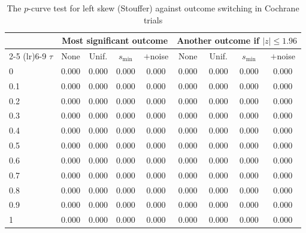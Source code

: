 \begin{table}[htbp]
\centering
\caption{The $p$-curve test for left skew (Stouffer) against outcome switching in Cochrane trials}
\label{tab:cochrane_switching_power_desktop_stouffer}
\footnotesize
\setlength{\tabcolsep}{4pt}
\begin{tabular}{lcccccccc}
\toprule
 & \multicolumn{4}{c}{Most significant outcome} & \multicolumn{4}{c}{Another outcome if $|z| \le 1.96$} \\
\cmidrule(lr){2-5} \cmidrule(lr){6-9}
$\tau$ & None & Unif. & $s_{\min}$ & $+$noise & None & Unif. & $s_{\min}$ & $+$noise \\
\midrule
0 & 0.000 & 0.000 & 0.000 & 0.000 & 0.000 & 0.000 & 0.000 & 0.000 \\
0.1 & 0.000 & 0.000 & 0.000 & 0.000 & 0.000 & 0.000 & 0.000 & 0.000 \\
0.2 & 0.000 & 0.000 & 0.000 & 0.000 & 0.000 & 0.000 & 0.000 & 0.000 \\
0.3 & 0.000 & 0.000 & 0.000 & 0.000 & 0.000 & 0.000 & 0.000 & 0.000 \\
0.4 & 0.000 & 0.000 & 0.000 & 0.000 & 0.000 & 0.000 & 0.000 & 0.000 \\
0.5 & 0.000 & 0.000 & 0.000 & 0.000 & 0.000 & 0.000 & 0.000 & 0.000 \\
0.6 & 0.000 & 0.000 & 0.000 & 0.000 & 0.000 & 0.000 & 0.000 & 0.000 \\
0.7 & 0.000 & 0.000 & 0.000 & 0.000 & 0.000 & 0.000 & 0.000 & 0.000 \\
0.8 & 0.000 & 0.000 & 0.000 & 0.000 & 0.000 & 0.000 & 0.000 & 0.000 \\
0.9 & 0.000 & 0.000 & 0.000 & 0.000 & 0.000 & 0.000 & 0.000 & 0.000 \\
1 & 0.000 & 0.000 & 0.000 & 0.000 & 0.000 & 0.000 & 0.000 & 0.000 \\
\bottomrule
\end{tabular}
\par\smallskip

\end{table}
